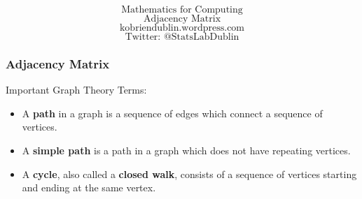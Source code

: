 \documentclass{beamer}
\begin{document}
\begin{frame}

{
\Huge
\[\mbox{Mathematics for Computing}\]
\[\mbox{Adjacency Matrix}\]
}
{
\LARGE
\[\mbox{kobriendublin.wordpress.com}\]
\[\mbox{Twitter: @StatsLabDublin}\]
}
\end{frame}
\begin{frame}
\frametitle{Adjacency Matrix}
\Large
\vspace{-1cm}
Important Graph Theory Terms:\\
\begin{itemize}
\item A \textbf{path} in a graph is a sequence of edges which connect a sequence of vertices. 

\item A \textbf{simple path} is a path in a graph which does not have repeating vertices.

\item A \textbf{cycle}, also called a \textbf{closed walk}, consists of a sequence of vertices starting and ending at the same vertex.
\end{itemize}


\end{frame}
\end{document}
